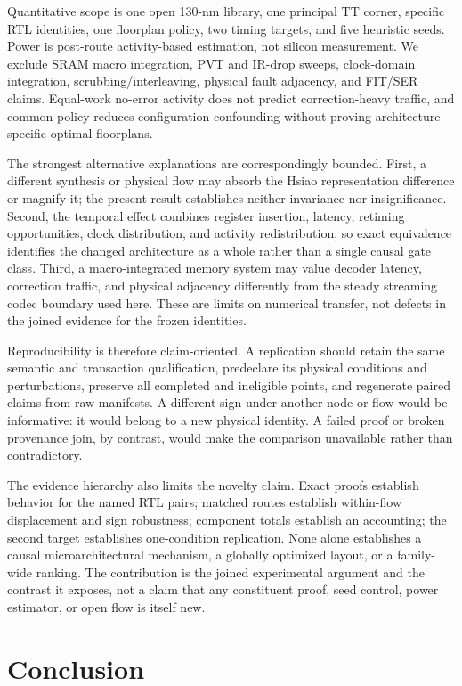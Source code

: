 \documentclass[conference,10pt]{IEEEtran}
\begin{document}
Quantitative scope is one open 130-nm library, one principal TT corner, specific RTL identities, one floorplan policy, two timing targets, and five heuristic seeds. Power is post-route activity-based estimation, not silicon measurement. We exclude SRAM macro integration, PVT and IR-drop sweeps, clock-domain integration, scrubbing/interleaving, physical fault adjacency, and FIT/SER claims. Equal-work no-error activity does not predict correction-heavy traffic, and common policy reduces configuration confounding without proving architecture-specific optimal floorplans.

The strongest alternative explanations are correspondingly bounded. First, a different synthesis or physical flow may absorb the Hsiao representation difference or magnify it; the present result establishes neither invariance nor insignificance. Second, the temporal effect combines register insertion, latency, retiming opportunities, clock distribution, and activity redistribution, so exact equivalence identifies the changed architecture as a whole rather than a single causal gate class. Third, a macro-integrated memory system may value decoder latency, correction traffic, and physical adjacency differently from the steady streaming codec boundary used here. These are limits on numerical transfer, not defects in the joined evidence for the frozen identities.

Reproducibility is therefore claim-oriented. A replication should retain the same semantic and transaction qualification, predeclare its physical conditions and perturbations, preserve all completed and ineligible points, and regenerate paired claims from raw manifests. A different sign under another node or flow would be informative: it would belong to a new physical identity. A failed proof or broken provenance join, by contrast, would make the comparison unavailable rather than contradictory.

The evidence hierarchy also limits the novelty claim. Exact proofs establish behavior for the named RTL pairs; matched routes establish within-flow displacement and sign robustness; component totals establish an accounting; the second target establishes one-condition replication. None alone establishes a causal microarchitectural mechanism, a globally optimized layout, or a family-wide ranking. The contribution is the joined experimental argument and the contrast it exposes, not a claim that any constituent proof, seed control, power estimator, or open flow is itself new.

\section{Conclusion}
\end{document}
